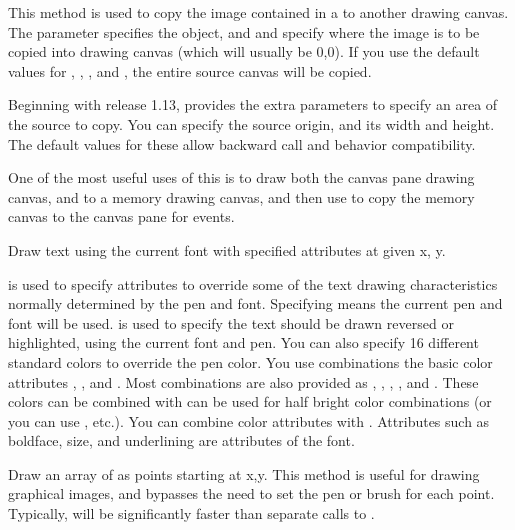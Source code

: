 This method is used to copy the image contained in a 
to another drawing canvas. The parameter  specifies
the  object, and  and 
specify where the image is to be copied into  drawing
canvas (which will usually be 0,0). If you use the default
values for , , , and
, the entire source canvas will be copied.

Beginning with \V release 1.13,  provides
the extra parameters to specify an area of the source to copy.
You can specify the source origin, and its width and height.
The default values for these allow backward call and behavior
compatibility.

One of the most useful uses of this is to draw both the canvas
pane drawing canvas, and to a memory drawing canvas, and then
use  to copy the memory canvas to the
canvas pane for  events.


Draw text using the current font with specified attributes at
given x, y.

 is used to specify attributes to override
some of the text drawing characteristics normally determined by
the pen and font. Specifying  means the current
pen and font will be used.   is used to specify
the text should be drawn reversed or highlighted, using the
current font and pen. You can also specify 16 different standard
colors to override the pen color. You use 
combinations the basic color attributes , ,
and . Most combinations are also provided as
, , ,  ,
and . These colors can be combined with 
can be used for half bright color combinations (or you can use
, etc.). You can combine color attributes with
. Attributes such as boldface, size, and
underlining are attributes of the font.


Draw an array of   as points starting at
x,y. This method is useful for drawing graphical images, and
bypasses the need to set the pen or brush for each point.
Typically,  will be significantly faster
than separate calls to .

